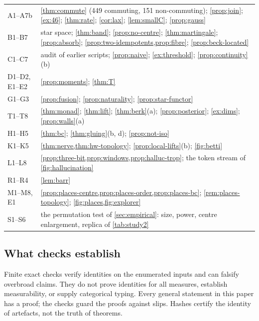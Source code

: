 \documentclass[11pt]{article}
\theoremstyle{definition}
\begin{document}
\begin{center}\small
\begin{tabular}{>{\raggedright}p{1.7cm}>{\raggedright\arraybackslash}p{12.6cm}}\toprule
A1--A7b & \cref{thm:commute} (449 commuting, 151 non-commuting); \cref{prop:join}; \cref{ex:46}; \cref{thm:rate}; \cref{cor:lax};
  \cref{lem:smallC}; \cref{prop:gauss}\\
B1--B7 & star space; \cref{thm:band}; \cref{prop:no-centre}; \cref{thm:martingale}; \cref{prop:absorb};
  \cref{prop:two-idempotents,prop:fibre}; \cref{prop:beck-located}\\
C1--C7 & audit of earlier scripts; \cref{prop:naive}; \cref{ex:threshold}; \cref{prop:continuity}(b)\\
D1--D2, E1--E2 & \cref{prop:moments}; \cref{thm:T}\\
G1--G3 & \cref{prop:fusion}; \cref{prop:naturality}; \cref{prop:star-functor}\\
T1--T8 & \cref{thm:monad}; \cref{thm:lift}; \cref{thm:berk}(a); \cref{prop:posterior}; \cref{ex:dims}; \cref{prop:walls}(a)\\
H1--H5 & \cref{thm:bc}; \cref{thm:gluing}(b, d); \cref{prop:not-iso}\\
K1--K5 & \cref{thm:nerve,thm:hw-topology}; \cref{prop:local-lifts}(b); \cref{fig:betti}\\
L1--L8 & \cref{prop:three-bit,prop:windows,prop:halluc-trop}; the token stream of \cref{fig:hallucination}\\
R1--R4 & \cref{lem:barr}\\
M1--M8, E1 & \cref{prop:places-centre,prop:places-order,prop:places-bc}; \cref{rem:places-topology}; \cref{fig:places,fig:explorer}\\
S1--S6 & the permutation test of \cref{sec:empirical}: size, power, centre enlargement, replica of \cref{tab:study2}\\
\bottomrule
\end{tabular}
\end{center}

\subsection{What checks establish}
Finite exact checks verify identities on the enumerated inputs and can falsify overbroad claims. They do not prove identities for all
measures, establish measurability, or supply categorical typing. Every general statement in this paper has a proof; the checks guard
the proofs against slips. Hashes certify the identity of artefacts, not the truth of theorems.
\end{document}
